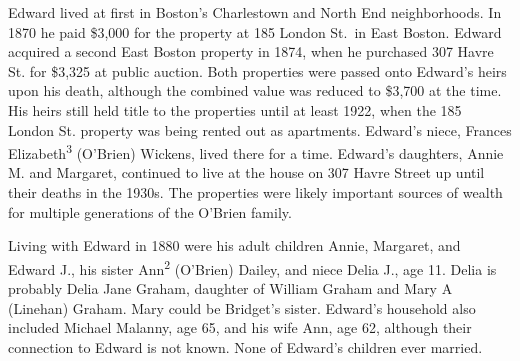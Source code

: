 Edward lived at first in Boston's Charlestown\cite{MaryAnn3OBrienBirth:1} and North End\cite{Edward3OBrienBirth:1} neighborhoods. In 1870 he paid \$3,000 for the property at 185 London St.\ in East Boston.\cite{LondonStDeed:2,LondonStMap} Edward acquired a second East Boston property in 1874, when he purchased 307 Havre St. for \$3,325 at public auction.\cite{HavrePurchase,HavreMap} Both properties were passed onto Edward's heirs upon his death, although the combined value was reduced to \$3,700 at the time.\cite{Edward2OBrienProbate} His heirs still held title to the properties until at least 1922,\cite{Bromley1922} when the 185 London St. property was being rented out as apartments.\cite{GlobeRobbery} Edward's niece, Frances Elizabeth\textsuperscript{3} (O'Brien) Wickens, lived there for a time.\cite{Frances3OBrien1914} Edward's daughters, Annie M. and Margaret, continued to live at the house on 307 Havre Street up until their deaths in the 1930s.\cite{AnnMaria3OBrienDeath:1,Margaret3OBrien2Death:1} The properties were likely important sources of wealth for multiple generations of the O'Brien family.

Living with Edward in 1880 were his adult children Annie, Margaret, and Edward J., his sister Ann\textsuperscript{2} (O'Brien) Dailey, and niece Delia J., age 11.\cite{Census1880Edward:2} Delia is probably Delia Jane Graham, daughter of William Graham and Mary A (Linehan) Graham.\cite{DeliaGrahamBirth,MaryGrahamDeath:2} Mary could be Bridget's sister. Edward's household also included Michael Malanny, age 65, and his wife Ann, age 62, although their connection to Edward is not known.\cite{Census1880Edward:3} None of Edward's children ever married. 

